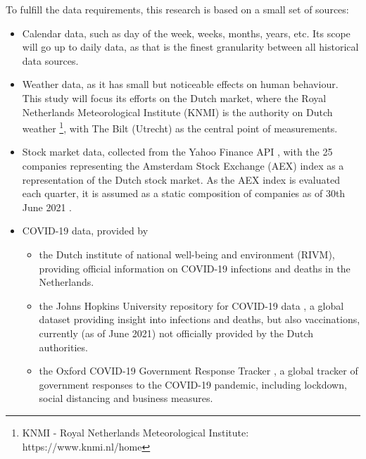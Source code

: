 To fulfill the data requirements, this research is based on a small set of sources:

\begin{itemize}
    \item Calendar data, such as day of the week, weeks, months, years, etc. Its scope will go up to daily data, as that is the finest granularity between all historical data sources.
    \item Weather data, as it has small but noticeable effects on human behaviour. This study will focus its efforts on the Dutch market, where the Royal Netherlands Meteorological Institute (KNMI) is the authority on Dutch weather \footnote{KNMI - Royal Netherlands Meteorological Institute: https://www.knmi.nl/home}, with The Bilt (Utrecht) as the central point of measurements.
    \item Stock market data, collected from the Yahoo Finance API \cite{aroussi_2017}, with the 25 companies representing the Amsterdam Stock Exchange (AEX) index as a representation of the Dutch stock market. As the AEX index is evaluated each quarter, it is assumed as a static composition of companies as of 30th June 2021 \cite{aexindex2021}.
    \item COVID-19 data, provided by
    \begin{itemize}
        \item the Dutch institute of national well-being and environment (RIVM), providing official information on COVID-19 infections and deaths in the Netherlands.
        \item the Johns Hopkins University repository for COVID-19 data \cite{dong2020interactive}, a global dataset providing insight into infections and deaths, but also vaccinations, currently (as of June 2021) not officially provided by the Dutch authorities.
        \item the Oxford COVID-19 Government Response Tracker \cite{hale2020variation}, a global tracker of government responses to the COVID-19 pandemic, including lockdown, social distancing and business measures.
    \end{itemize}
\end{itemize}


